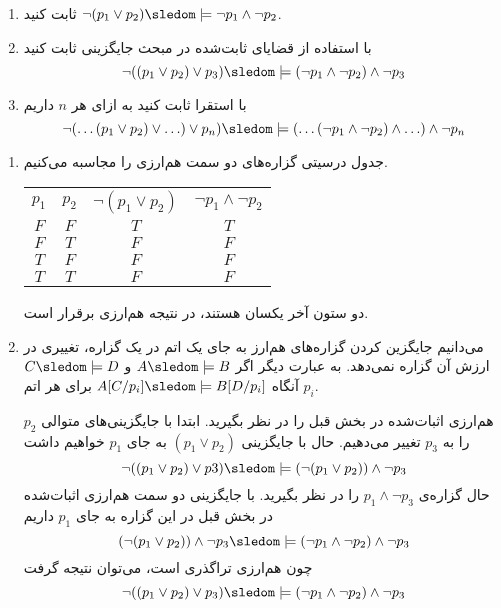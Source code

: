 \begin{enumerate}[label=(\alph*)]
  \item
  ثابت کنید
  $\neg(p_1\vee p_2)\sledom\models\neg p_1\wedge\neg p_2$.
  
  \item
  با استفاده از قضایای ثابت‌شده در مبحث جایگزینی ثابت کنید
  $$\neg((p_1\vee p_2)\vee p_3)\sledom\models (\neg p_1 \wedge \neg p_2)\wedge\neg p_3$$
  
  \item
  با استقرا ثابت کنید به ازای هر $n$ داریم
  $$\neg(\ldots(p_1\vee p_2)\vee \ldots)\vee p_n)\sledom\models (\ldots(\neg p_1\wedge \neg p_2)\wedge\ldots)\wedge\neg p_n$$
\end{enumerate}\quad\vspace{-9mm}
  \begin{ans}
    \begin{enumerate}
      \item جدول درسیتی گزاره‌های دو سمت هم‌ارزی را مجاسبه می‌کنیم.
      \begin{LTR}
        \begin{tabular}{| c | c | c | c |}
          $p_1$ & $p_2$ & $\neg (p_1 \vee p_2)$ & $\neg p_1 \wedge \neg p_2$ \\
          $F$ & $F$ & $T$ & $T$ \\
          $F$ & $T$ & $F$ & $F$ \\
          $T$ & $F$ & $F$ & $F$ \\
          $T$ & $T$ & $F$ & $F$
        \end{tabular}
      \end{LTR}
      دو ستون آخر یکسان هستند، در نتیجه هم‌ارزی برقرار است.
  
      \item
      می‌دانیم جایگزین کردن گزاره‌های هم‌ارز به جای یک اتم در یک گزاره، تغییری در ارزش آن گزاره نمی‌دهد. به عبارت دیگر اگر
      $A \sledom\models B$ و
      $C \sledom\models D$
      آنگاه
      $A[C/p_i] \sledom\models B[D/p_i]$
      برای هر اتم $p_i$.
  
      هم‌ارزی اثبات‌شده در بخش قبل را در نظر بگیرید. ابتدا با جایگزینی‌های متوالی $p_2$ را به $p_3$ تغییر می‌دهیم.
      حال با جایگزینی
      $(p_1 \vee p_2)$
      به جای
      $p_1$
      خواهیم داشت
      $$ \neg ((p_1 \vee p_2) \vee p3) \sledom\models (\neg (p_1 \vee p_2)) \wedge \neg p_3 $$
      حال گزاره‌ی
      $p_1 \wedge \neg p_3$
      را در نظر بگیرید. با جایگزینی دو سمت هم‌ارزی اثبات‌شده در بخش قبل در این گزاره به جای
      $p_1$
      داریم
      $$ (\neg (p_1 \vee p_2)) \wedge \neg p_3 \sledom\models (\neg p_1 \wedge \neg p_2) \wedge \neg p_3 $$
      چون هم‌ارزی تراگذری است، می‌توان نتیجه گرفت
      $$ \neg((p_1\vee p_2)\vee p_3)\sledom\models (\neg p_1 \wedge \neg p_2)\wedge\neg p_3 $$
  

\end{enumerate}
\end{ans}
